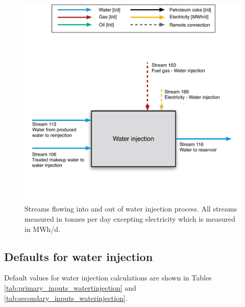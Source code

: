 \documentclass[11pt]{report}
\begin{document}
\begin{figure}
\includegraphics[width=0.8\columnwidth]{images/Water_injection_PF.pdf}
\caption{Streams flowing into and out of water injection process. All streams measured in tonnes per day excepting electricity which is measured in MWh/d.}
\label{fig:water_injection_PF}
\end{figure}

\subsection{Defaults for water injection}

Default values for water injection calculations are shown in Tables \ref{tab:primary_inputs_watertinjection} and \ref{tab:secondary_inputs_waterinjection}.

\end{document}

